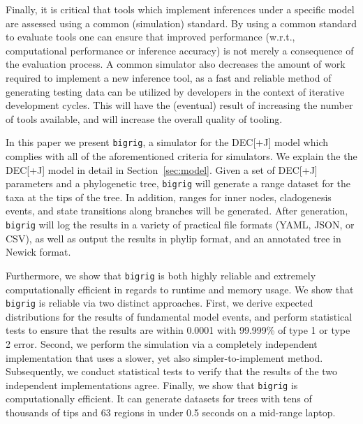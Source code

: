 \documentclass[a4paper]{article}
\newcommand{\bigrig}{\texttt{bigrig}}
\newcommand{\decj}{DEC[+J]}
\begin{document}
Finally, it is critical that tools which implement inferences under a specific model are assessed using a common (simulation) standard.
By using a common standard to evaluate tools one can ensure that improved performance (w.r.t., computational performance or inference accuracy) is not merely a consequence of the evaluation process.
A common simulator also decreases the amount of work required to implement a new inference tool, as a fast and reliable method of generating testing data can be utilized by developers in the context of iterative development cycles.
This will have the (eventual) result of increasing the number of tools available, and will increase the overall quality of tooling.

In this paper we present \bigrig{}, a simulator for the \decj{}  model
which complies with all of the aforementioned criteria for simulators.
We explain the the \decj{} model in detail in Section~\ref{sec:model}.
Given a set of \decj{} parameters and a phylogenetic tree, \bigrig{} will generate a range dataset  for the taxa at the
tips of the tree.
In addition, ranges for inner nodes, cladogenesis events, and state transitions along branches will be generated.
After generation, \bigrig{} will log the results in a variety of practical file formats (YAML, JSON, or CSV), as well as output
the results in phylip format, and an annotated tree in Newick format.

Furthermore, we show that \bigrig{} is both highly reliable and extremely computationally efficient in regards to runtime and memory usage.
We show that \bigrig{} is reliable via two distinct approaches.
First, we derive expected distributions for the results of fundamental model events, and perform statistical
tests to ensure that the results are within 0.0001 with 99.999\% of type 1 or type 2 error.
Second, we perform the simulation via a completely independent implementation that uses a slower, yet also simpler-to-implement
method. 
Subsequently, we conduct statistical tests to verify that the results of the two independent implementations agree.
Finally, we show that \bigrig{} is computationally efficient. 
It can generate datasets for trees with tens of thousands of tips and 63 regions in under 0.5  seconds on a mid-range laptop.

\end{document}
